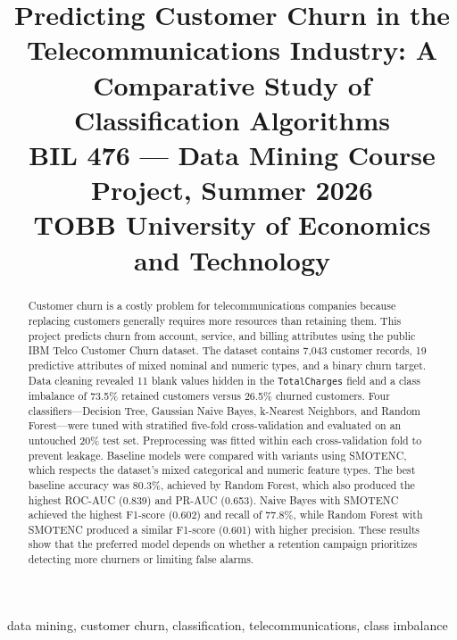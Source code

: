 \documentclass[conference]{IEEEtran}
\begin{document}
	
	\title{Predicting Customer Churn in the Telecommunications Industry: A Comparative Study of Classification Algorithms\\
		{\footnotesize BIL 476 --- Data Mining Course Project, Summer 2026\\
			TOBB University of Economics and Technology}
	}
	
	\author{
	}
	
	\maketitle
	
	\begin{abstract}
	Customer churn is a costly problem for telecommunications companies because replacing customers generally requires more resources than retaining them. This project predicts churn from account, service, and billing attributes using the public IBM Telco Customer Churn dataset. The dataset contains 7{,}043 customer records, 19 predictive attributes of mixed nominal and numeric types, and a binary churn target. Data cleaning revealed 11 blank values hidden in the \texttt{TotalCharges} field and a class imbalance of 73.5\% retained customers versus 26.5\% churned customers. Four classifiers---Decision Tree, Gaussian Naive Bayes, k-Nearest Neighbors, and Random Forest---were tuned with stratified five-fold cross-validation and evaluated on an untouched 20\% test set. Preprocessing was fitted within each cross-validation fold to prevent leakage. Baseline models were compared with variants using SMOTENC, which respects the dataset's mixed categorical and numeric feature types. The best baseline accuracy was 80.3\%, achieved by Random Forest, which also produced the highest ROC-AUC (0.839) and PR-AUC (0.653). Naive Bayes with SMOTENC achieved the highest F1-score (0.602) and recall of 77.8\%, while Random Forest with SMOTENC produced a similar F1-score (0.601) with higher precision. These results show that the preferred model depends on whether a retention campaign prioritizes detecting more churners or limiting false alarms.
	\end{abstract}
	
	\begin{IEEEkeywords}
		data mining, customer churn, classification, telecommunications, class imbalance
	\end{IEEEkeywords}
	
\end{document}
